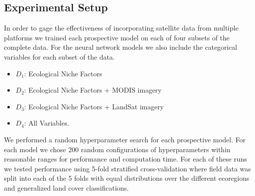 \def\year{2017}\relax \documentclass[letterpaper]{article}
\begin{document}
\subsection{Experimental Setup}
In order to gage the effectiveness of incorporating satellite data from multiple platforms we trained each prospective model on each of four subsets of the complete data. For the neural network models we also include the categorical variables for each subset of the data. 
\begin{itemize}
	\item $D_1$: Ecological Niche Factors 
	\item $D_2$:  Ecological Niche Factors + MODIS imagery
	\item $D_3$:  Ecological Niche Factors + LandSat imagery
	\item $D_4$: All Variables.
\end{itemize} 
We performed a random hyperparameter search for each prospective model. For each model we chose 200 random configurations of hyperparameters within reasonable ranges for performance and computation time. For each of these runs we tested performance using 5-fold stratified cross-validation where field data was split  into each of the 5 folds with equal distributions over the different ecoregions and generalized land cover classifications. 
\end{document}
